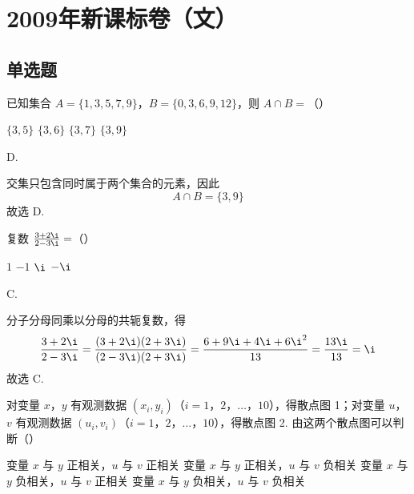 \chapter{2009年新课标卷（文）}

\section{单选题}

\begin{problem}
已知集合 \(A = \{1, 3, 5, 7, 9\}\)，\(B = \{0, 3, 6, 9, 12\}\)，则 \(A \cap B =\)（\quad）

\choices
    {\( \{3, 5\} \)}
    {\(\{3,6\}\)}
    {\(\{3,7\}\)}
    {\(\{3,9\}\)}
\end{problem}

\begin{answer}
D.
\end{answer}

\begin{solution}
交集只包含同时属于两个集合的元素，因此
\[
A\cap B=\{3,9\}
\]
故选 D.
\end{solution}

\begin{problem}
复数 \(\frac{3 + 2\i}{2 - 3\i} =\)（\quad）

\choices
    {\(1\)}
    {\(-1\)}
    {\(\i\)}
    {\(-\i\)}
\end{problem}

\begin{answer}
C.
\end{answer}

\begin{solution}
分子分母同乘以分母的共轭复数，得
\[
\frac{3+2\i}{2-3\i}
=\frac{(3+2\i)(2+3\i)}{(2-3\i)(2+3\i)}
=\frac{6+9\i+4\i+6\i^{2}}{13}
=\frac{13\i}{13}=\i
\]
故选 C.
\end{solution}

\begin{problem}
对变量 \(x\)，\(y\) 有观测数据 \((x_{i}, y_{i})\)（\(i = 1\)，\(2\)，\(\dots\)，\(10\)），得散点图 1；对变量 \(u\)，\(v\) 有观测数据 \((u_{i}, v_{i})\)（\(i = 1\)，\(2\)，\(\dots\)，\(10\)），得散点图 2. 由这两个散点图可以判断（\quad）


\choices
    {变量 \(x\) 与 \(y\) 正相关，\(u\) 与 \(v\) 正相关}
    {变量 \(x\) 与 \(y\) 正相关，\(u\) 与 \(v\) 负相关}
    {变量 \(x\) 与 \(y\) 负相关，\(u\) 与 \(v\) 正相关}
    {变量 \(x\) 与 \(y\) 负相关，\(u\) 与 \(v\) 负相关}
\end{problem}

